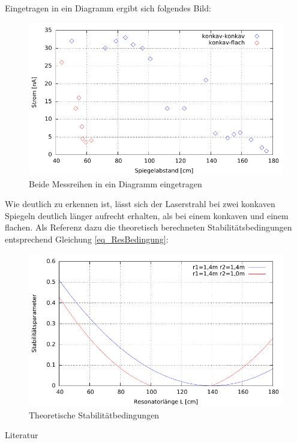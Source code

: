 Eingetragen in ein Diagramm ergibt sich folgendes Bild:
\begin{figure}[h!]
\includegraphics[scale=1]{../gnu/Abstand.pdf}
\caption{Beide Messreihen in ein Diagramm eingetragen}
\label{gra_abstand}
\end{figure}

Wie deutlich zu erkennen ist, lässt sich der Laserstrahl bei zwei konkaven Spiegeln deutlich länger aufrecht erhalten, als bei einem konkaven und einem flachen. Als Referenz dazu die theoretisch berechneten Stabilitätsbedingungen entsprechend Gleichung \eqref{eq_ResBedingung}:
\begin{figure}[h!]
\includegraphics[scale=1]{../gnu/stabilitaetsparameter.pdf}
\caption{Theoretische Stabilitätbedingungen}
\label{gra_stabil}
\end{figure}

\parskip 340pt
\Large{Literatur}\\\\





